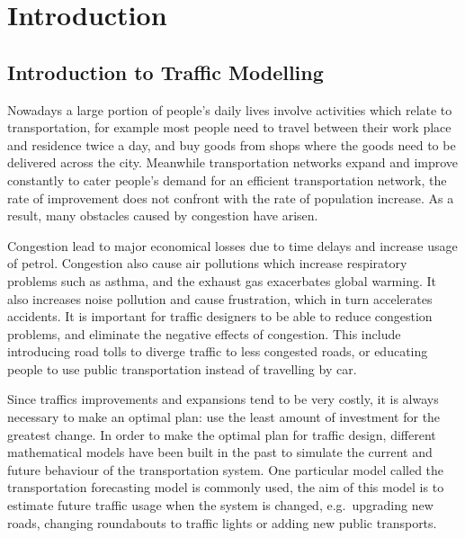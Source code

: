 \chapter{Introduction}



\section{Introduction to Traffic Modelling}

Nowadays a large portion of people's daily lives involve activities which relate to transportation,
for example most people need to travel between their work place and residence twice a day,
and buy goods from shops where the goods need to be delivered across the city.
Meanwhile transportation networks expand and improve constantly to cater people's demand for an efficient transportation network,
the rate of improvement does not confront with the rate of population increase.
As a result, many obstacles caused by congestion have arisen.

Congestion lead to major economical losses due to time delays and increase usage of petrol.
Congestion also cause air pollutions which increase respiratory problems such as asthma, 
and the exhaust gas exacerbates global warming.
It also increases noise pollution and cause frustration,
which in turn accelerates accidents.
It is important for traffic designers to be able to reduce congestion problems,
and eliminate the negative effects of congestion.
This include introducing road tolls to diverge traffic to less congested roads,
or educating people to use public transportation instead of travelling by car.

Since traffics improvements and expansions tend to be very costly,
it is always necessary to make an optimal plan:
use the least amount of investment for the greatest change.
In order to make the optimal plan for traffic design,
different mathematical models have been built in the past to simulate the current and future behaviour of the transportation system.
One particular model called the transportation forecasting model is commonly used,
the aim of this model is to estimate future traffic usage when the system is changed, e.g.\ upgrading new roads, changing roundabouts to traffic lights or adding new public transports. 

